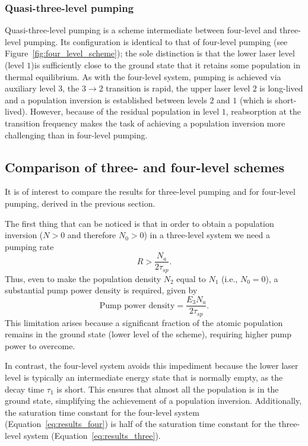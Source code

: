 \documentclass[prl,twocolumn]{revtex4-1}
\begin{document}
\subsubsection{\textbf{Quasi-three-level pumping}}
Quasi-three-level pumping is a scheme intermediate between four-level
and three-level pumping. Its configuration is identical to that of four-level pumping (see Figure~\ref{fig:four_level_scheme}); the sole distinction is that the lower laser level (level $1$)is sufficiently close to the ground state that it retains some population in thermal equilibrium. As with the four-level system, pumping is achieved via auxiliary level $3$, the $3 \to 2$ transition is rapid, the
upper laser level $2$ is long-lived and a population inversion is established between levels $2$ and $1$ (which is short-lived).
However, because of the residual population in level $1$, reabsorption at the transition frequency makes the task of achieving a population inversion more challenging than in four-level pumping.

\subsection{Comparison of three- and four-level schemes}
It is of interest to compare the results for three-level pumping and for four-level pumping, derived in the previous section.

The first thing that can be noticed is that in order to obtain a population inversion ($N > 0$ and therefore $N_0 > 0$) in a three-level system we need a pumping rate 
%
\begin{equation}
    R > \frac{N_a}{2\tau_{sp}}.
\end{equation}
%
Thus, even to make the population density $N_2$ equal to $N_1$ (i.e., $N_0 = 0$), a substantial pump power density is required, given by 
%
\begin{equation}
\text{Pump power density} = \frac{E_3 N_a}{2\tau_{sp}}.
\end{equation}
%
This limitation arises because a significant fraction of the atomic population remains in the ground state (lower level of the scheme), requiring higher pump power to overcome.

In contrast, the four-level system avoids this impediment because the lower laser level is typically an intermediate energy state that is normally empty, as the decay time $\tau_1$ is short. This ensures that almost all the population is in the ground state, simplifying the achievement of a population inversion. Additionally, the saturation time constant for the four-level system (Equation~\eqref{eq:results_four}) is half of the saturation time constant for the three-level system (Equation~\eqref{eq:results_three}).
\end{document}
